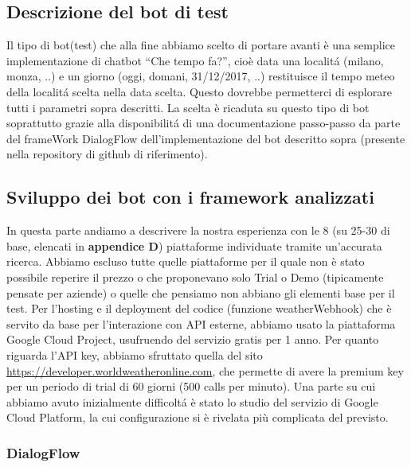 \documentclass[]{article}
\begin{document}
\subsection{Descrizione del bot di test}
Il tipo di bot(test) che alla fine abbiamo scelto di portare avanti è una semplice implementazione di chatbot “Che tempo fa?”, cioè data una localitá (milano, monza, ..) e un giorno (oggi, domani, 31/12/2017, ..) restituisce il tempo meteo della localitá scelta nella data scelta. Questo dovrebbe permetterci di esplorare tutti i parametri sopra descritti.
La scelta è ricaduta su questo tipo di bot soprattutto grazie alla disponibilitá di una documentazione passo-passo da parte del frameWork DialogFlow dell'implementazione del bot descritto sopra (presente nella repository di github di riferimento).

\subsection{Sviluppo dei bot con i framework analizzati}
In questa parte andiamo a descrivere la nostra esperienza con le 8 (su 25-30 di base, elencati in \textbf{appendice D}) piattaforme individuate tramite un'accurata ricerca. Abbiamo escluso tutte quelle piattaforme per il quale non è stato possibile reperire il prezzo o che proponevano solo Trial o Demo (tipicamente pensate per aziende) o quelle che pensiamo non abbiano gli elementi base per il test.
Per l’hosting e il deployment del codice (funzione weatherWebhook) che è servito da base per l’interazione con API esterne, abbiamo usato la piattaforma Google Cloud Project, usufruendo del servizio gratis per 1 anno. Per quanto riguarda l’API key, abbiamo sfruttato quella del sito \url{https://developer.worldweatheronline.com}, che permette di avere la premium key per un periodo di trial di 60 giorni (500 calls per minuto). Una parte su cui abbiamo avuto inizialmente difficoltá è stato lo studio del servizio di Google Cloud Platform, la cui configurazione si è rivelata più complicata del previsto.
\subsubsection{DialogFlow} 
\end{document}

